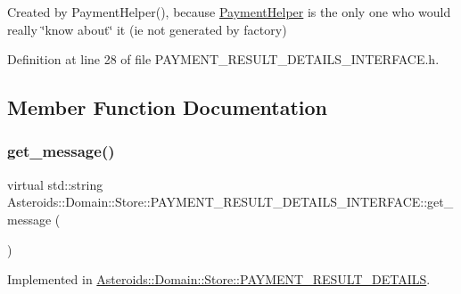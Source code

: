 Created by Payment\+Helper(), because \hyperlink{classAsteroids_1_1Domain_1_1Store_1_1PaymentHelper}{Payment\+Helper} is the only one who would really \char`\"{}know about\char`\"{} it (ie not generated by factory) 

Definition at line 28 of file P\+A\+Y\+M\+E\+N\+T\+\_\+\+R\+E\+S\+U\+L\+T\+\_\+\+D\+E\+T\+A\+I\+L\+S\+\_\+\+I\+N\+T\+E\+R\+F\+A\+C\+E.\+h.



\subsection{Member Function Documentation}
\mbox{\label{classAsteroids_1_1Domain_1_1Store_1_1PAYMENT__RESULT__DETAILS__INTERFACE_a2e8cac0ecf2e5b03781c82061006fcb5}} 
\subsubsection{\texorpdfstring{get\+\_\+message()}{get\_message()}}
{\footnotesize\ttfamily virtual std\+::string Asteroids\+::\+Domain\+::\+Store\+::\+P\+A\+Y\+M\+E\+N\+T\+\_\+\+R\+E\+S\+U\+L\+T\+\_\+\+D\+E\+T\+A\+I\+L\+S\+\_\+\+I\+N\+T\+E\+R\+F\+A\+C\+E\+::get\+\_\+message (\begin{DoxyParamCaption}{ }\end{DoxyParamCaption})\hspace{0.3cm}{\ttfamily [pure virtual]}}



Implemented in \hyperlink{classAsteroids_1_1Domain_1_1Store_1_1PAYMENT__RESULT__DETAILS_ab0e02bd3cbd1b221ca1aac3d7a21484f}{Asteroids\+::\+Domain\+::\+Store\+::\+P\+A\+Y\+M\+E\+N\+T\+\_\+\+R\+E\+S\+U\+L\+T\+\_\+\+D\+E\+T\+A\+I\+LS}.

